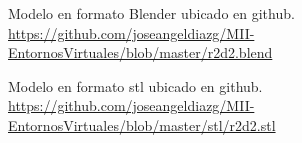 % 

\begin{thebibliography}{99}

	\emph{} Modelo en formato Blender ubicado en github. \url{https://github.com/joseangeldiazg/MII-EntornosVirtuales/blob/master/r2d2.blend}

	\emph{} Modelo en formato stl ubicado en github. \url{https://github.com/joseangeldiazg/MII-EntornosVirtuales/blob/master/stl/r2d2.stl}	
	
\end{thebibliography}
